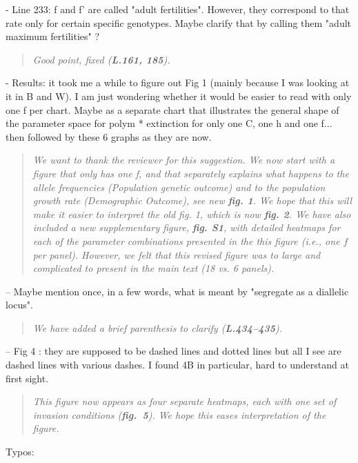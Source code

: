 \documentclass[11pt]{article}
\begin{document}
- Line 233: f and f’ are called "adult fertilities". However, they correspond to that rate only for certain specific genotypes. Maybe clarify that by calling them "adult maximum fertilities" ?

\begin{quote}
	{\itshape Good point, fixed ({\bf L.161, 185}).}
\end{quote}

- Results: it took me a while to figure out Fig 1 (mainly because I was looking at it in B and W). I am just wondering whether it would be easier to read with only one f per chart. Maybe as a separate chart that illustrates the general shape of the parameter space for polym * extinction for only one C, one h and one f... then followed by these 6 graphs as they are now.

\begin{quote}
	{\itshape We want to thank the reviewer for this suggestion. We now start with a figure that only has one f, and that separately explains what happens to the allele frequencies (Population genetic outcome) and to the population growth rate (Demographic Outcome), see new {\bf fig. 1}. We hope that this will make it easier to interpret the old fig. 1, which is now {\bf fig. 2}. We have also included a new supplementary figure, {\bf fig. S1}, with detailed heatmaps for each of the parameter combinations presented in the this figure (i.e., one $f$ per panel). However, we felt that this revised figure was to large and complicated to present in the main text (18 vs. 6 panels).}
\end{quote}

\noindent-- Maybe mention once, in a few words, what is meant by "segregate as a diallelic locus".
\begin{quote}
	{\itshape We have added a brief parenthesis to clarify ({\bf L.434--435}).}
\end{quote}

\noindent-- Fig 4 : they are supposed to be dashed lines and dotted lines but all I see are dashed lines with various dashes. I found 4B in particular, hard to understand at first sight.

\begin{quote}
	{\itshape This figure now appears as four separate heatmaps, each with one set of invasion conditions ({\bf fig.~5}). We hope this eases interpretation of the figure.}
\end{quote}
\bigskip

\noindent Typos:
\smallskip
\end{document}
